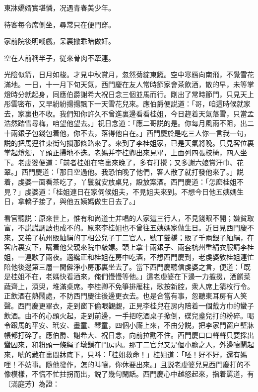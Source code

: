 \begin{myquote}
東牀嬌婿實堪憐，况遇青春美少年。

待客每令席側坐，尋常只在便門穿。

家前院後明嘲戲，呆裏撒乖暗做奸。

空在人前稱半子，従來骨肉不牽連。
\end{myquote}

光陰似箭，日月如梭。才見中秋賞月，忽然菊綻東籬。空中寒鴈向南飛，不覺雪花滿地。一日，十一月下旬天氣，西門慶在友人常時節家會茶飲酒，散的早，未等掌燈時分就起身，同應伯爵謝希大祝日念三個並馬而行。剛出了常時節門，只見天上彤雲密布，又早紛紛揚揚飄下一天雪花兒來。應伯爵便説道：「哥，咱這時候就家去，家裏也不收。我們知你許久不曾進裏邊看看桂姐，今日趂着天氣落雪，只當孟浩然踏雪尋梅，咱望他望去。」祝日念道：「應二哥説的是。你每月風雨不阻，出二十兩銀子包錢包着他，你不去，落得他自在。」西門慶於是吃三人你一言我一句，説的把馬逕往東街勾攔那條路來了。來到了李桂姐家，已是天氣將晚。只見客位裏掌起燈燭，丫頭正掃地不迭。老媽并李桂卿出來見畢，上面列四張校椅，四人坐下。老虔婆便道：「前者桂姐在宅裏來晚了，多有打攪；又多謝六娘賞汗巾、花翠。」西門慶道：「那日空過他。我恐怕晚了他們，客人散了就打發他來了。」説着，虔婆一面看茶吃了，丫鬟就安放桌兒，設放案酒。西門慶道：「怎麽桂姐不見？」虔婆道：「桂姐連日在家伺候姐夫，不見姐夫來到。不想今日他五姨媽生日，拿轎子接了，與他五姨媽做生日去了。」

看官聽説：原來世上，惟有和尚道士并唱的人家這三行人，不見錢眼不開；嫌貧取富，不説謊調詖也成不的。原來李桂姐也不曾往五姨媽家做生日。近日見西門慶不來，又接了杭州販紬絹的丁相公兒子丁二官人，號丁雙橋；販了千兩銀子紬絹，在客店裏安下，瞞着他父親來院中敲嫖。頭上拿十兩銀子、兩套杭州重絹衣服請李桂姐，一連歇了兩夜。適纔正和桂姐在房中吃酒，不想西門慶到，老虔婆敎桂姐連忙陪他後邊第三層一間僻淨小房那裏坐去了。當下西門慶聽信虔婆之言，便道：「既是桂姐不在，老媽快看酒來，俺們慢慢等他。」這老虔婆在下邊一力攛掇，酒餚菜蔬齊上，湏臾，堆滿桌席。李桂卿不免箏排雁柱，歌按新腔，衆人席上猜枚行令。正飲酒在熱鬧處，不防西門慶往後邊更衣去。也是合當有事，忽聽東耳房有人笑聲。西門慶更畢衣，走到窗下偷眼觀覷，正見李桂兒在房内陪着一個戴方巾的蠻子飲酒。由不的心頭火起，走到前邊，一手把吃酒桌子掀倒，碟兒盞兒打的粉碎。喝令跟馬的平安、玳安、畫童、琴童，四個小廝上來，不由分説，把李家門窗户壁牀帳都打碎了。應伯爵、謝希大、祝日念，向前拉勸不住。西門慶口口聲聲只要採出蠻囚來，和粉頭一條䋲子墩鎖在門房内。那丁二官兒又是個小膽之人，外邊嚷鬧起來，唬的藏在裏間牀底下，只呌：「桂姐救命！」桂姐道：「呸！好不好，還有媽哩！不妨事。隨他發作，怎的叫嚷，你休要出來。」且説老虔婆兒見西門慶打的不像模樣，不慌不忙拄拐而出，説了幾句閑話。西門慶心中越怒起來，指着罵道，有〔滿庭芳〕為證：

